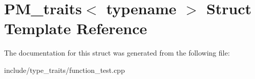 \hypertarget{structPM__traits}{}\section{P\+M\+\_\+traits$<$ typename $>$ Struct Template Reference}
\label{structPM__traits}


The documentation for this struct was generated from the following file\+:\begin{DoxyCompactItemize}
\item 
include/type\+\_\+traits/function\+\_\+test.\+cpp\end{DoxyCompactItemize}
